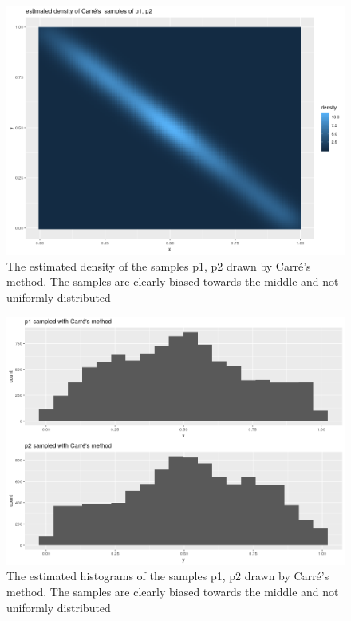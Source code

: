 	 \begin{minipage}{\linewidth}
	 	\centering
	 	\begin{minipage}{0.45\linewidth}
	 		\begin{figure}[H]
	 				\includegraphics[width=0.9\linewidth]{img/carre_estimated_density_p1_p2.png}
	 			\caption{The estimated density of the samples p1, p2 drawn by Carré's method. The samples are clearly biased towards the middle and not uniformly distributed}
	 		\end{figure}
	 	\end{minipage}
	 	\hspace{0.05\linewidth}
	 	\begin{minipage}{0.45\linewidth}
	 		\begin{figure}[H]
	 				\includegraphics[width=0.9\linewidth]{img/carre_p1_p2_hists.png}
	 			\caption{The estimated histograms of the samples p1, p2 drawn by Carré's method. The samples are clearly biased towards the middle and not uniformly distributed}
	 		\end{figure}
	 	\end{minipage}
	 \end{minipage}




